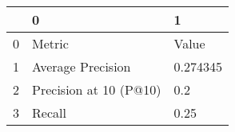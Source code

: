 \begin{tabular}{lll}
\toprule
{} &                       0 &         1 \\
\midrule
0 &                  Metric &     Value \\
1 &       Average Precision &  0.274345 \\
2 &  Precision at 10 (P@10) &       0.2 \\
3 &                  Recall &      0.25 \\
\bottomrule
\end{tabular}
